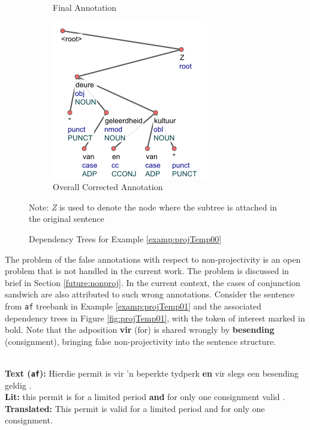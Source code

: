 \begin{figure}[H]
\begin{subfigure}{.5\textwidth}
    \caption{Final Annotation}
    \label{projTempFix00-mod}  
    \end{subfigure}
    \begin{subfigure}{\textwidth}
    \centering
    \includegraphics[scale=0.80]{img/projTempFix00-correct1.png}
    \caption{Overall Corrected Annotation}
    \label{projTempFix00-correct1}  
    \end{subfigure}
    \caption{Dependency Trees for Example \ref{examp:projTemp00}}
    Note: \textit{Z} is used to denote the node where the subtree is attached in the original sentence
    \label{fig:projTemp00}
\end{figure}

The problem of the false annotations with respect to non-projectivity is an open problem that is not handled in the current work. The problem is discussed in brief in Section \ref{future:nonproj}. In the current context, the cases of conjunction sandwich are also attributed to such wrong annotations. Consider the sentence from \verb|af| treebank in Example \ref{examp:projTemp01} and the associated dependency trees in Figure \ref{fig:projTemp01}, with the token of interest marked in bold. Note that the adposition \textbf{vir} (for) is shared wrongly by \textbf{besending} (consignment), bringing false non-projectivity into the sentence structure. 

\begin{example}
\label{examp:projTemp01}
\textbf{ }\\
\textbf{Text (\texttt{af}):} Hierdie permit is vir 'n beperkte tydperk \textbf{en} vir slegs een besending geldig .\\
\textbf{Lit:} this permit is for a limited period \textbf{and} for only one consignment valid . \\
\textbf{Translated:} This permit is valid for a limited period and for only one consignment.
\end{example}

